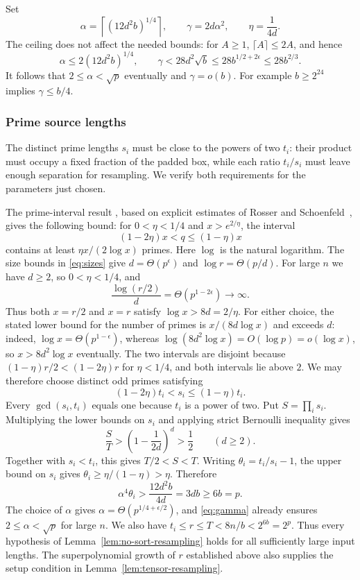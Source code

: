Set
\[
 \alpha=\left\lceil(12d^2b)^{1/4}\right\rceil,
 \qquad \gamma=2d\alpha^2,\qquad \eta=\frac1{4d}.
\]
The ceiling does not affect the needed bounds: for $A\ge1$,
$\lceil A\rceil\le2A$, and hence
\begin{equation}\label{eq:gamma}
 \alpha\le2(12d^2b)^{1/4},\qquad
 \gamma<28d^2\sqrt b\le28b^{1/2+2\epsilon}\le28b^{2/3}.
\end{equation}
It follows that $2\le\alpha<\sqrt p$ eventually and $\gamma=o(b)$.
For example $b\ge2^{24}$ implies $\gamma\le b/4$.

\subsubsection{Prime source lengths}

The distinct prime lengths $s_i$ must be close to the powers of two
$t_i$: their product must occupy a fixed fraction of the padded box,
while each ratio $t_i/s_i$ must leave enough separation for resampling.
We verify both requirements for the parameters just chosen.

The prime-interval result
\cite[Lemma~5.1]{HarveyHoeven2021}, based on explicit estimates of
Rosser and Schoenfeld~\cite{RosserSchoenfeld1962}, gives the following
bound: for
$0<\eta<1/4$ and $x>e^{2/\eta}$, the interval
\[
 (1-2\eta)x<q\leq(1-\eta)x
\]
contains at least $\eta x/(2\log x)$ primes. Here $\log$ is the natural
logarithm. The size bounds in \eqref{eq:sizes} give
$d=\Theta(p^\epsilon)$ and $\log r=\Theta(p/d)$.
For large $n$ we have $d\geq2$, so
$0<\eta<1/4$, and
\[
 \frac{\log(r/2)}d=\Theta(p^{1-2\epsilon})\longrightarrow\infty.
\]
Thus both $x=r/2$ and $x=r$ satisfy $\log x>8d=2/\eta$.
For either choice, the stated lower bound for the number of primes is
$x/(8d\log x)$ and exceeds $d$:
indeed, $\log x=\Theta(p^{1-\epsilon})$, whereas
$\log(8d^2\log x)=O(\log p)=o(\log x)$, so $x>8d^2\log x$ eventually.
The two intervals are disjoint because
$(1-\eta)r/2<(1-2\eta)r$ for $\eta<1/4$, and both intervals lie above
$2$. We may therefore choose distinct odd primes satisfying
\[
 (1-2\eta)t_i<s_i\leq(1-\eta)t_i.
\]
Every $\gcd(s_i,t_i)$ equals one because $t_i$ is a power of two.
Put $S=\prod_i s_i$. Multiplying the lower bounds on $s_i$ and
applying strict Bernoulli inequality gives
\[
 \frac ST>
 \left(1-\frac1{2d}\right)^d>\frac12
 \qquad(d\geq2).
\]
Together with $s_i<t_i$, this gives $T/2<S<T$.
Writing $\theta_i=t_i/s_i-1$, the upper bound on $s_i$ gives
$\theta_i\geq\eta/(1-\eta)>\eta$. Therefore
\[
 \alpha^4\theta_i>\frac{12d^2b}{4d}=3db\geq6b=p.
\]
The choice of $\alpha$ gives
$\alpha=\Theta(p^{1/4+\epsilon/2})$, and \eqref{eq:gamma} already
ensures $2\leq\alpha<\sqrt p$ for large $n$. We also have
$t_i\leq r\leq T<8n/b<2^{6b}=2^p$.
Thus every hypothesis of Lemma~\ref{lem:no-sort-resampling} holds for
all sufficiently large input lengths. The superpolynomial growth of $r$
established above also supplies the setup condition in
Lemma~\ref{lem:tensor-resampling}.

